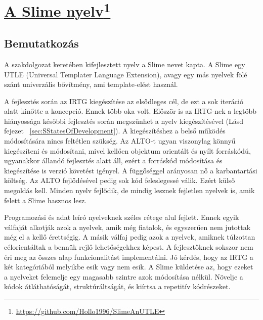 
\chapter[A Slime nyelv]{\href{https://github.com/Hollo1996/SlimeAnUTLE}{A Slime nyelv}\footnote{\url{https://github.com/Hollo1996/SlimeAnUTLE}}}
\label{sec:Slime}
\section{Bemutatkozás}
\label{sec:SIntro}
A szakdolgozat keretében kifejlesztett nyelv a Slime nevet kapta.
A Slime egy UTLE (Universal Templater Language Extension), 
avagy egy más nyelvek fölé szánt univerzális bővítmény, ami template-elést használ.

A fejlesztés során az IRTG kiegészítése az elsődleges cél, de ezt a sok iteráció alatt kinőtte a koncepció. 
Ennek több oka volt. 
Először is az IRTG-nek a legtöbb hiányossága későbbi fejlesztés során megszűnhet a nyelv kiegészítésével (Lásd fejezet ~\ref{sec:SStatesOfDevelopment}).
A kiegészítéshez a belső működés módosítására nincs feltétlen szükség. 
Az ALTO-t ugyan viszonylag könnyű kiegészíteni és módosítani, mivel kellően objektum orientált és nyílt forráskódú,
ugyanakkor állandó fejlesztés alatt áll, ezért a forráskód módosítása és kiegészítése is verzió követést igényel. 
A függőséggel arányosan nő a karbantartási költség. 
Az ALTO fejlődésével pedig sok kód feleslegessé válik. 
Ezért külső megoldás kell. 
Minden nyelv fejlődik, de mindig lesznek fejletlen nyelvek is, amik felett a Slime hasznos lesz.

Programozási és adat leíró nyelveknek széles rétege alul fejlett. 
Ennek egyik válfaját alkotják azok a nyelvek, amik még fiatalok, és egyszerűen nem jutottak még el a kellő érettségig. 
A másik válfaj pedig azok a nyelvek, amiknek túlzottan célorientáltak a bennük rejlő lehetőségekhez képest.
A fejlesztőknek sokszor nem éri meg az összes alap funkcionalitást implementálni. 
Jó kérdés, hogy az IRTG a két kategóriából melyikbe esik vagy nem esik. 
A Slime küldetése az, hogy ezeket a nyelveket felemelje egy magasabb szintre azok módosítása nélkül. 
Növelje a kódok átláthatóságát, struktúráltságát, és kiírtsa a repetitív kódrészeket.

